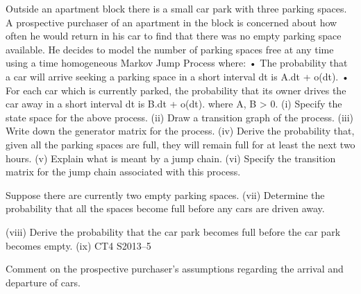 Outside an apartment block there is a small car park with three parking spaces. A
prospective purchaser of an apartment in the block is concerned about how often he
would return in his car to find that there was no empty parking space available. He
decides to model the number of parking spaces free at any time using a time
homogeneous Markov Jump Process where:
• The probability that a car will arrive seeking a parking space in a short interval
dt is A.dt + o(dt).
• For each car which is currently parked, the probability that its owner drives the
car away in a short interval dt is B.dt + o(dt).
where A, B > 0.
(i) Specify the state space for the above process. 
(ii) Draw a transition graph of the process. 
(iii) Write down the generator matrix for the process. 
(iv) Derive the probability that, given all the parking spaces are full, they will
remain full for at least the next two hours. 
(v) Explain what is meant by a jump chain. 
(vi) Specify the transition matrix for the jump chain associated with this process.

Suppose there are currently two empty parking spaces.
(vii)
Determine the probability that all the spaces become full before any cars are
driven away.

(viii) Derive the probability that the car park becomes full before the car park
becomes empty.
(ix)
CT4 S2013–5

Comment on the prospective purchaser’s assumptions regarding the arrival
and departure of cars.


